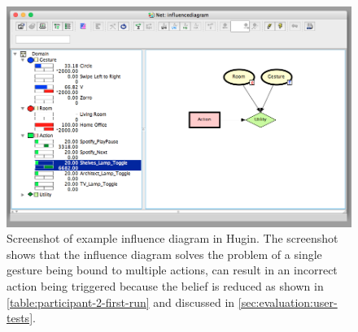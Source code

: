 \begin{figure}[h]
\centering
\includegraphics[width=\textwidth]{images/hugin-influence-diagram}
\caption{Screenshot of example influence diagram in Hugin. The screenshot shows that the influence diagram solves the problem of a single gesture being bound to multiple actions, can result in an incorrect action being triggered because the belief is reduced as shown in \cref{table:participant-2-first-run} and discussed in \cref{sec:evaluation:user-tests}.}
\label{fig:evaluation:alternative-models:hugin-influence-diagram}
\end{figure}


